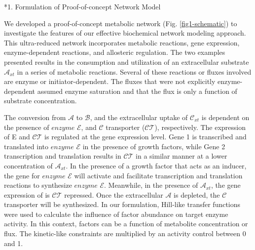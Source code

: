\documentclass[12pt]{article}
\makeatletter
\renewcommand\subsection{\@startsection
	{subsection}{2}{0mm}
	{-0.05in}
	{-0.5\baselineskip}
	{\normalfont\normalsize\bfseries}}
\makeatother
\begin{document}

\subsection*{1. Formulation of Proof-of-concept Network Model}

We developed a proof-of-concept metabolic network (Fig. \ref{fig1-schematic}) to investigate the features of our effective biochemical network modeling approach. This ultra-reduced network incorporates metabolic reactions, gene expression, enzyme-dependent reactions, and allosteric regulation. The two examples presented results in the consumption and utilization of an extracellular substrate $\mathcal{A}_{xt}$ in a series of metabolic reactions. Several of these reactions or fluxes involved are enzyme or initiator-dependent. The fluxes that were not explicitly enzyme-dependent assumed enzyme saturation and that the flux is only a function of substrate concentration. 

The conversion from $\mathcal{A}$ to $\mathcal{B}$, and the extracellular uptake of $\mathcal{C}_{xt}$ is dependent on the presence of $enzyme$ $\mathcal{E}$, and $\mathcal{C}$ transporter ($\mathcal{CT}$), respectively. The expression of E and $\mathcal{CT}$ is regulated at the gene expression level. Gene 1 is transcribed and translated into $enzyme$ $\mathcal{E}$ in the presence of growth factors, while Gene 2 transcription and translation results in $\mathcal{CT}$ in a similar manner at a lower concentration of $\mathcal{A}_{xt}$. In the presence of a growth factor that acts as an inducer, the gene for $enzyme$ $\mathcal{E}$ will activate and facilitate transcription and translation reactions to synthesize $enzyme$ $\mathcal{E}$. Meanwhile, in the presence of $\mathcal{A}_{xt}$, the gene expression of is $\mathcal{CT}$ repressed. Once the extracellular $\mathcal{A}$ is depleted, the $\mathcal{C}$ transporter will be synthesized. In our formulation, Hill-like transfer functions were used to calculate the influence of factor abundance on target enzyme activity. In this context, factors can be a function of metabolite concentration or flux. The kinetic-like constraints are multiplied by an activity control between 0 and 1. 
\end{document}
